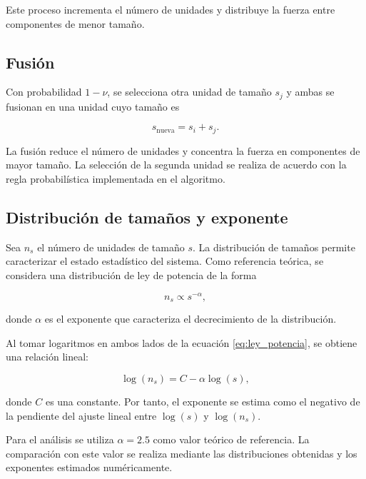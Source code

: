 \documentclass[
a4paper,
amsfonts,
amssymb,
amsmath,
reprint,
twoside
]{revtex4-1}
\begin{document}
Este proceso incrementa el número de unidades y distribuye la
fuerza entre componentes de menor tamaño.

\subsection{Fusión}

Con probabilidad $1-\nu$, se selecciona otra unidad de tamaño $s_j$
y ambas se fusionan en una unidad cuyo tamaño es

\begin{equation}
    s_{\mathrm{nueva}}=s_i+s_j.
    \label{eq:fusion}
\end{equation}

La fusión reduce el número de unidades y concentra la fuerza en
componentes de mayor tamaño. La selección de la segunda unidad
se realiza de acuerdo con la regla probabilística implementada
en el algoritmo.

\subsection{Distribución de tamaños y exponente}

Sea $n_s$ el número de unidades de tamaño $s$. La distribución de
tamaños permite caracterizar el estado estadístico del sistema.
Como referencia teórica, se considera una distribución de ley de
potencia de la forma

\begin{equation}
    n_s\propto s^{-\alpha},
    \label{eq:ley_potencia}
\end{equation}

donde $\alpha$ es el exponente que caracteriza el decrecimiento
de la distribución.

Al tomar logaritmos en ambos lados de la ecuación
\eqref{eq:ley_potencia}, se obtiene una relación lineal:

\begin{equation}
    \log(n_s)=C-\alpha\log(s),
    \label{eq:ajuste_lineal}
\end{equation}

donde $C$ es una constante. Por tanto, el exponente se estima
como el negativo de la pendiente del ajuste lineal entre
$\log(s)$ y $\log(n_s)$.

Para el análisis se utiliza $\alpha=2.5$ como valor teórico de
referencia. La comparación con este valor se realiza mediante
las distribuciones obtenidas y los exponentes estimados
numéricamente.
\end{document}
